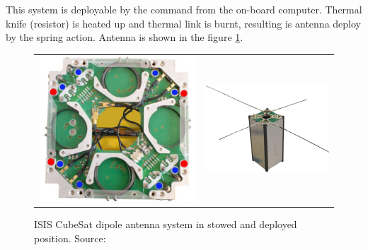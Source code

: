 This system is deployable by the command from the on-board computer. Thermal knife (resistor) is heated up and thermal link is burnt, resulting is antenna deploy by the spring action. Antenna is shown in the figure \ref{ISIS_antenna}.

\begin{figure}
   \centering
\begin{tabular}{cc}
        \includegraphics[width=0.3\paperwidth]{img/6/isis_antenna_stowed.jpg}
    & 
        \includegraphics[width=0.45\paperwidth]{img/6/CubeSat-antenna-dipole-configuration.png}    
\end{tabular}
\label{ISIS_antenna}
\caption{ISIS CubeSat dipole antenna system in stowed and deployed position. Source: \cite{isis_dipole_antenna}}
\end{figure}


